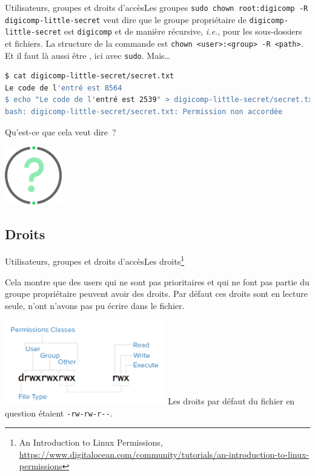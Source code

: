 \documentclass{beamer}
\begin{document}
    \begin{frame}[fragile]{Utilisateurs, groupes et droits d'accès}{Les groupes}
        \lstinline{sudo chown root:digicomp -R digicomp-little-secret} veut dire que le groupe propriétaire de \lstinline{digicomp-little-secret} est \lstinline{digicomp} et de manière récursive, \textit{i.e.}, pour les sous-dossiers et fichiers.
        La structure de la commande est \lstinline{chown <user>:<group> -R <path>}.
        Et il faut là aussi être , ici avec \lstinline{sudo}.
        \bigbreak
        Mais\ldots
        \begin{lstlisting}[language=bash]
$ cat digicomp-little-secret/secret.txt
Le code de l'entré est 8564
$ echo "Le code de l'entré est 2539" > digicomp-little-secret/secret.txt
bash: digicomp-little-secret/secret.txt: Permission non accordée
        \end{lstlisting}
        Qu'est-ce que cela veut dire~?
        \begin{center}
            \includegraphics[width=2.5cm]{image/question-mark}
        \end{center}
    \end{frame}

    \subsection{Droits}\label{subsec:droits}

    \begin{frame}{Utilisateurs, groupes et droits d'accès}{Les droits\footnote{\label{rights-digitalocean}An Introduction to Linux Permissions, \url{https://www.digitalocean.com/community/tutorials/an-introduction-to-linux-permissions}}}
        \begin{dangercolorbox}
            Cela montre que des users qui ne sont pas prioritaires et qui ne font pas partie du groupe propriétaire peuvent avoir des droits.
            Par défaut ces droits sont en lecture seule, n'ont n'avons pas pu écrire dans le fichier.
        \end{dangercolorbox}
        \centering
        \includegraphics[width=7cm]{image/permission-classes}
        \flushleft
        Les droits par défaut du fichier en question étaient \lstinline{-rw-rw-r--}.
    \end{frame}
\end{document}
